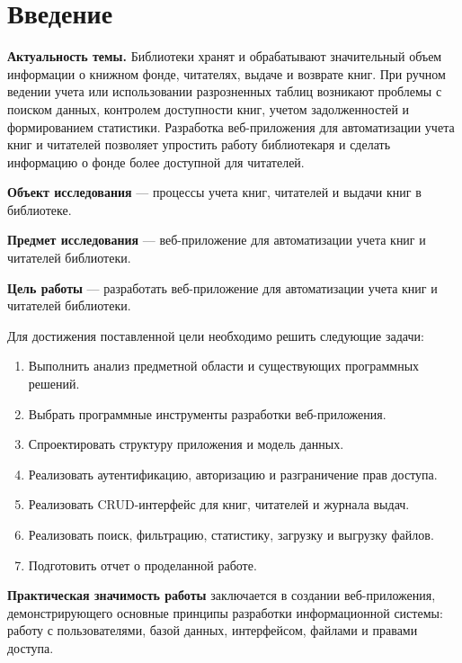 \section*{Введение}

\textbf{Актуальность темы.} Библиотеки хранят и обрабатывают значительный объем
информации о книжном фонде, читателях, выдаче и возврате книг. При ручном ведении
учета или использовании разрозненных таблиц возникают проблемы с поиском данных,
контролем доступности книг, учетом задолженностей и формированием статистики.
Разработка веб-приложения для автоматизации учета книг и читателей позволяет
упростить работу библиотекаря и сделать информацию о фонде более доступной для
читателей.

\textbf{Объект исследования} --- процессы учета книг, читателей и выдачи книг в
библиотеке.

\textbf{Предмет исследования} --- веб-приложение для автоматизации учета книг и
читателей библиотеки.

\textbf{Цель работы} --- разработать веб-приложение для автоматизации учета книг
и читателей библиотеки.

Для достижения поставленной цели необходимо решить следующие задачи:

\begin{enumerate}
    \item Выполнить анализ предметной области и существующих программных решений.
    \item Выбрать программные инструменты разработки веб-приложения.
    \item Спроектировать структуру приложения и модель данных.
    \item Реализовать аутентификацию, авторизацию и разграничение прав доступа.
    \item Реализовать CRUD-интерфейс для книг, читателей и журнала выдач.
    \item Реализовать поиск, фильтрацию, статистику, загрузку и выгрузку файлов.
    \item Подготовить отчет о проделанной работе.
\end{enumerate}

\textbf{Практическая значимость работы} заключается в создании веб-приложения,
демонстрирующего основные принципы разработки информационной системы:
работу с пользователями, базой данных, интерфейсом, файлами и правами
доступа.